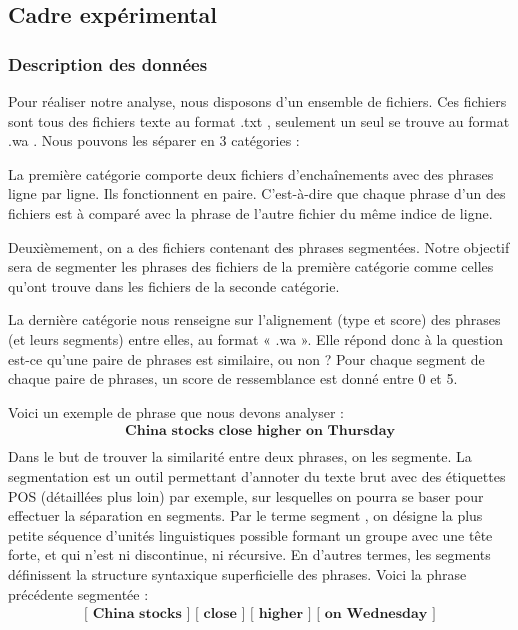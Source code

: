 \documentclass[a4paper, twoside, 11pt]{article}
\begin{document}
    \subsection{Cadre expérimental}

        \subsubsection{Description des données}

 Pour réaliser notre analyse, nous disposons d’un ensemble de fichiers. Ces fichiers sont tous des fichiers texte au format \og .txt \fg{}, seulement un seul se trouve au format \og.wa \fg{}. Nous pouvons les séparer en 3 catégories :

La première catégorie comporte deux fichiers d’enchaînements avec des phrases ligne par ligne. Ils fonctionnent en paire. C’est-à-dire que chaque phrase d’un des fichiers est à comparé avec la phrase de l’autre fichier du même indice de ligne.

Deuxièmement, on a des fichiers contenant des phrases segmentées. Notre objectif sera de segmenter les phrases des fichiers de la première catégorie comme celles qu'ont trouve dans les fichiers de la seconde catégorie.

La dernière catégorie nous renseigne sur l’alignement (type et score) des phrases (et leurs segments) entre elles, au format « .wa ». Elle répond donc à la question \og est-ce qu’une paire de phrases est similaire, ou non ? \fg{} Pour chaque segment de chaque paire de phrases, un score de ressemblance est donné entre 0 et 5.

Voici un exemple de phrase que nous devons analyser :
  \begin{eqnarray*}
\textbf{China stocks close higher on Thursday}\\
 \end{eqnarray*}
 Dans le but de trouver la similarité entre deux phrases, on les segmente. La segmentation est un outil permettant d'annoter du texte brut avec des étiquettes POS (détaillées plus loin) par exemple, sur lesquelles on pourra se baser pour effectuer la séparation en segments. Par le terme \og segment \fg{}, on désigne la plus petite séquence d'unités linguistiques possible formant un groupe avec une tête forte, et qui n'est ni discontinue, ni récursive. En d’autres termes, les segments définissent la structure syntaxique superficielle des phrases. Voici la phrase précédente segmentée :
  \begin{eqnarray*}
\textbf{[ China stocks ] [ close ] [ higher ] [ on Wednesday ]}\\
 \end{eqnarray*}
\end{document}
